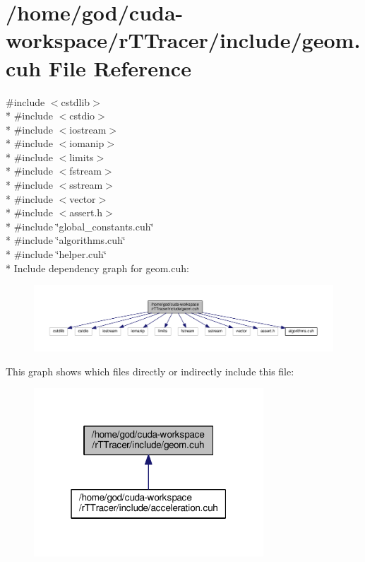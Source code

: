 \hypertarget{r_t_tracer_2include_2geom_8cuh}{}\section{/home/god/cuda-\/workspace/r\+T\+Tracer/include/geom.cuh File Reference}
\label{r_t_tracer_2include_2geom_8cuh}
{\ttfamily \#include $<$cstdlib$>$}\\*
{\ttfamily \#include $<$cstdio$>$}\\*
{\ttfamily \#include $<$iostream$>$}\\*
{\ttfamily \#include $<$iomanip$>$}\\*
{\ttfamily \#include $<$limits$>$}\\*
{\ttfamily \#include $<$fstream$>$}\\*
{\ttfamily \#include $<$sstream$>$}\\*
{\ttfamily \#include $<$vector$>$}\\*
{\ttfamily \#include $<$assert.\+h$>$}\\*
{\ttfamily \#include \char`\"{}global\+\_\+constants.\+cuh\char`\"{}}\\*
{\ttfamily \#include \char`\"{}algorithms.\+cuh\char`\"{}}\\*
{\ttfamily \#include \char`\"{}helper.\+cuh\char`\"{}}\\*
Include dependency graph for geom.\+cuh\+:
\nopagebreak
\begin{figure}[H]
\begin{center}
\leavevmode
\includegraphics[width=350pt]{r_t_tracer_2include_2geom_8cuh__incl}
\end{center}
\end{figure}
This graph shows which files directly or indirectly include this file\+:
\nopagebreak
\begin{figure}[H]
\begin{center}
\leavevmode
\includegraphics[width=244pt]{r_t_tracer_2include_2geom_8cuh__dep__incl}
\end{center}
\end{figure}
